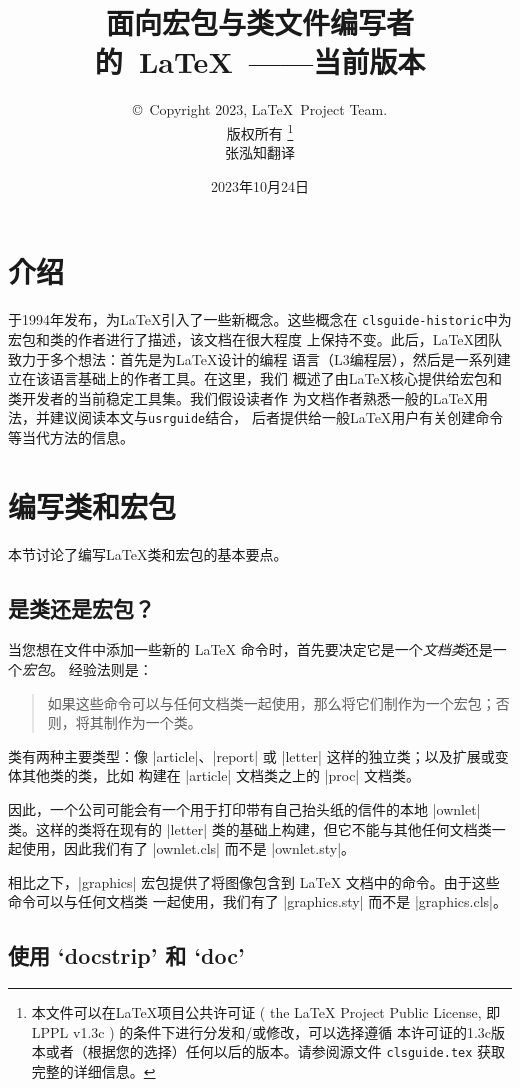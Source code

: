 \documentclass{ltxguide}
\title{\color{spot}\huge\bfseries 面向宏包与类文件编写者\\[3pt]的\ \LaTeX\Large\ ——当前版本}
\author{\copyright~Copyright 2023, \LaTeX\ Project Team.\\
   版权所有%
   \footnote{本文件可以在\LaTeX{}项目公共许可证 ( the \LaTeX{} Project Public License, 即 LPPL v1.3c ) 的条件下进行分发和/或修改，可以选择遵循
   本许可证的1.3c版本或者（根据您的选择）任何以后的版本。请参阅源文件
   \texttt{clsguide.tex} 获取完整的详细信息。}%
   \\[6pt]
   张泓知\qquad 翻译
}
\date{2023年10月24日}
\begin{document}
\maketitle

\tableofcontents

\section{介绍}

\LaTeXe{}于1994年发布，为\LaTeX{}引入了一些新概念。这些概念在
\texttt{clsguide-historic}中为宏包和类的作者进行了描述，该文档在很大程度
上保持不变。此后，\LaTeX{}团队致力于多个想法：首先是为\LaTeX{}设计的编程
语言（L3编程层），然后是一系列建立在该语言基础上的作者工具。在这里，我们
概述了由\LaTeX{}核心提供给宏包和类开发者的当前稳定工具集。我们假设读者作
为文档作者熟悉一般的\LaTeX{}用法，并建议阅读本文与\texttt{usrguide}结合，
后者提供给一般\LaTeX{}用户有关创建命令等当代方法的信息。

\section{编写类和宏包}
\label{Sec:writing}

本节讨论了编写\LaTeX{}类和宏包的基本要点。

\subsection{是类还是宏包？}
\label{Sec:classorpkg}

当您想在文件中添加一些新的 \LaTeX{} 命令时，首先要决定它是一个\emph{文档类}还是一个\emph{宏包}。
经验法则是：
\begin{quote}
   如果这些命令可以与任何文档类一起使用，那么将它们制作为一个宏包；否则，将其制作为一个类。
\end{quote}

类有两种主要类型：像 |article|、|report| 或 |letter| 这样的独立类；以及扩展或变体其他类的类，比如
构建在 |article| 文档类之上的 |proc| 文档类。

因此，一个公司可能会有一个用于打印带有自己抬头纸的信件的本地 |ownlet| 类。这样的类将在现有的 |letter|
类的基础上构建，但它不能与其他任何文档类一起使用，因此我们有了 |ownlet.cls| 而不是 |ownlet.sty|。

相比之下，|graphics| 宏包提供了将图像包含到 \LaTeX{} 文档中的命令。由于这些命令可以与任何文档类
一起使用，我们有了 |graphics.sty| 而不是 |graphics.cls|。

\subsection{使用 `docstrip' 和 `doc'}
\end{document}
